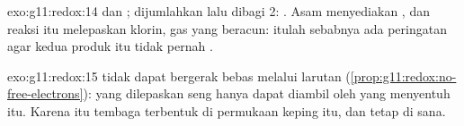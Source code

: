 \begin{solution}{exo:g11:redox:14}
 dan ;
dijumlahkan lalu dibagi 2: . Asam
menyediakan  , dan reaksi itu melepaskan klorin, gas yang
beracun: itulah sebabnya ada peringatan agar kedua produk itu tidak
pernah .
\end{solution}

\begin{solution}{exo:g11:redox:15}
 tidak dapat bergerak bebas melalui larutan
(\cref{prop:g11:redox:no-free-electrons}):  yang dilepaskan 
seng hanya dapat diambil oleh   yang menyentuh  itu.
Karena itu  tembaga terbentuk di permukaan keping itu, dan tetap di
sana.
\end{solution}

